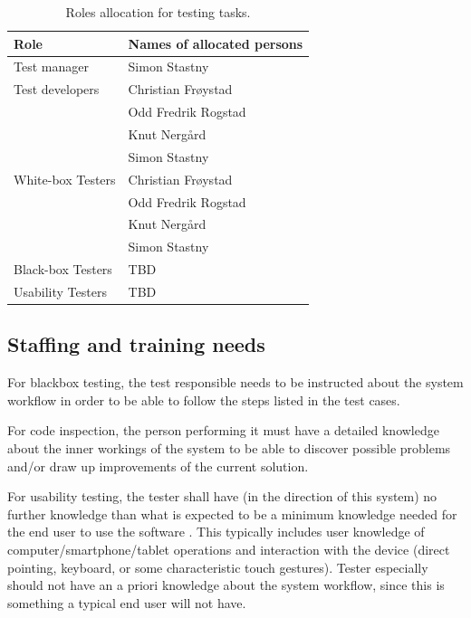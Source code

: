 \documentclass[11pt]{book}
\begin{document}
\begin{table}[H]
	\centering
	\begin{tabular}{| l | l |}
		\hline
		Role & Names of allocated persons \\ \hline

		Test manager 		& Simon Stastny \\ \hline

		Test developers 	& Christian Frøystad \\
							& Odd Fredrik Rogstad \\
							& Knut Nergård \\
							& Simon Stastny \\ \hline

		White-box Testers 	& Christian Frøystad \\
							& Odd Fredrik Rogstad \\
							& Knut Nergård \\
							& Simon Stastny \\ \hline

		Black-box Testers 	& TBD \\ \hline %

		Usability Testers 	& TBD \\ \hline %
	\end{tabular}
	\label{tab:test_plan_roles_allocation}
	\caption{Roles allocation for testing tasks.}
\end{table}

\subsection{Staffing and training needs}
For blackbox testing, the test responsible needs to be instructed about the system workflow in order to be able to follow the steps listed in the test cases.

For code inspection, the person performing it must have a detailed knowledge about the inner workings of the system to be able to discover possible problems and/or draw up improvements of the current solution.

For usability testing, the tester shall have (in the direction of this system) no further knowledge than what is expected to be a minimum knowledge needed for the end user to use the software . This typically includes user knowledge of computer/smartphone/tablet operations and interaction with the device (direct pointing, keyboard, or some characteristic touch gestures). Tester especially should not have an a priori knowledge about the system workflow, since this is something a typical end user will not have.
\end{document}
